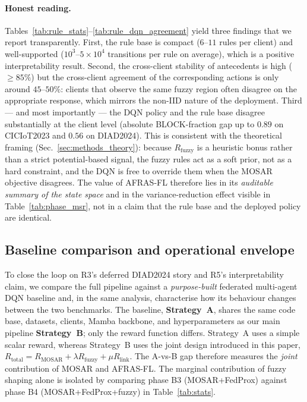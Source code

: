 \documentclass[ai,article,submit,moreauthors,pdftex]{Definitions/mdpi}
\newcommand{\rev}[1]{#1}
\begin{document}
\rev{\paragraph{Honest reading.}
Tables~\ref{tab:rule_stats}--\ref{tab:rule_dqn_agreement} yield three
findings that we report transparently. First, the rule base is
compact ($6$--$11$ rules per client) and well-supported ($10^{3}$--$5{\times}10^{4}$
transitions per rule on average), which is a positive interpretability
result. Second, the cross-client stability of antecedents is high
($\geq 85\%$) but the cross-client agreement of the corresponding
actions is only around $45$--$50\%$: clients that observe the same
fuzzy region often disagree on the appropriate response, which
mirrors the non-IID nature of the deployment. Third --- and most
importantly --- the DQN policy and the rule base disagree
substantially at the client level (absolute BLOCK-fraction gap up to
$0.89$ on CICIoT2023 and $0.56$ on DIAD2024). This is consistent
with the theoretical framing (Sec.~\ref{sec:methods_theory}): because
$R_{\text{fuzzy}}$ is a heuristic bonus rather than a strict
potential-based signal, the fuzzy rules act as a soft prior, not as
a hard constraint, and the DQN is free to override them when the
MOSAR objective disagrees. The value of AFRAS-FL therefore lies in
its \emph{auditable summary of the state space} and in the
variance-reduction effect visible in Table~\ref{tab:phase_msr}, not
in a claim that the rule base and the deployed policy are identical.}

\subsection{Baseline comparison and operational envelope}\label{sec:r6_envelope}

To close the loop on R3's deferred DIAD2024 story and R5's
interpretability claim, we compare the full pipeline against a
\emph{purpose-built} federated multi-agent DQN baseline and, in the
same analysis, characterise how its behaviour changes between the
two benchmarks. The baseline, \textbf{Strategy~A}, shares the same
code base, datasets, clients, Mamba backbone, and hyperparameters
as our main pipeline \textbf{Strategy~B}; only the reward function
differs. Strategy~A uses a simple scalar reward, whereas Strategy~B
uses the joint design introduced in this paper, $R_{\text{total}} =
R_{\text{MOSAR}} + \lambda R_{\text{fuzzy}} + \mu R_{\text{link}}$. The
A-vs-B gap therefore measures the \emph{joint} contribution of MOSAR
and AFRAS-FL. The marginal contribution of fuzzy shaping alone is
isolated by comparing phase B3 (MOSAR+FedProx) against phase B4
(MOSAR+FedProx+fuzzy) in Table~\ref{tab:stats}.
\end{document}
